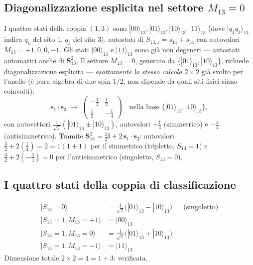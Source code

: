 \documentclass[11pt,a4paper]{article}
\begin{document}
\subsection{Diagonalizzazione esplicita nel settore $M_{13}=0$}

I quattro stati della coppia $(1,3)$ sono $|00\rangle_{13},|01\rangle_{13},|10\rangle_{13},|11\rangle_{13}$
(dove $|q_1q_3\rangle_{13}$ indica $q_1$ del sito $1$, $q_3$ del sito $3$),
autostati di $S_{13,z}=s_{1z}+s_{3z}$ con autovalori $M_{13}=+1,0,0,-1$. Gli
stati $|00\rangle_{13}$ e $|11\rangle_{13}$ sono già non degeneri — autostati
automatici anche di $\mathbf S_{13}^2$. Il settore $M_{13}=0$, generato da
$\{|01\rangle_{13},|10\rangle_{13}\}$, richiede diagonalizzazione esplicita —
\emph{esattamente lo stesso calcolo $2\times2$} già svolto per l'anello (è
pura algebra di due spin $1/2$, non dipende da quali siti fisici siano
coinvolti):
\begin{equation}
\mathbf s_1\cdot\mathbf s_3\;\longrightarrow\;
\begin{pmatrix}-\tfrac14 & \tfrac12\\ \tfrac12 & -\tfrac14\end{pmatrix}
\quad\text{nella base }\{|01\rangle_{13},|10\rangle_{13}\},
\end{equation}
con autovettori $\tfrac1{\sqrt2}(|01\rangle_{13}\pm|10\rangle_{13})$, autovalori
$+\tfrac14$ (simmetrico) e $-\tfrac34$ (antisimmetrico). Tramite
$\mathbf S_{13}^2=\tfrac32\mathbb I+2\,\mathbf s_1\cdot\mathbf s_3$: autovalori
$\tfrac32+2(\tfrac14)=2=1(1{+}1)$ per il simmetrico (tripletto, $S_{13}=1$)
e $\tfrac32+2(-\tfrac34)=0$ per l'antisimmetrico (singoletto, $S_{13}=0$).

\subsection{I quattro stati della coppia di classificazione}

\begin{align}
|S_{13}{=}0\rangle &= \tfrac1{\sqrt2}\big(|01\rangle_{13}-|10\rangle_{13}\big) &&\text{(singoletto)}\label{eq:s13_0}\\
|S_{13}{=}1,M_{13}{=}{+}1\rangle &= |00\rangle_{13} \\
|S_{13}{=}1,M_{13}{=}0\rangle &= \tfrac1{\sqrt2}\big(|01\rangle_{13}+|10\rangle_{13}\big) \\
|S_{13}{=}1,M_{13}{=}{-}1\rangle &= |11\rangle_{13}
\end{align}
Dimensione totale $2\times2=4=1+3$: verificata.
\end{document}
